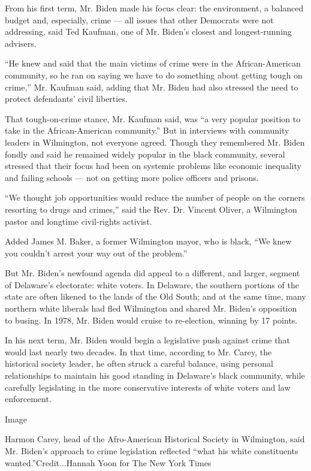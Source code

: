 From his first term, Mr. Biden made his focus clear: the environment, a
balanced budget and, especially, crime --- all issues that other
Democrats were not addressing, said Ted Kaufman, one of Mr. Biden's
closest and longest-running advisers.

``He knew and said that the main victims of crime were in the
African-American community, so he ran on saying we have to do something
about getting tough on crime,'' Mr. Kaufman said, adding that Mr. Biden
had also stressed the need to protect defendants' civil liberties.

That tough-on-crime stance, Mr. Kaufman said, was ``a very popular
position to take in the African-American community.'' But in interviews
with community leaders in Wilmington, not everyone agreed. Though they
remembered Mr. Biden fondly and said he remained widely popular in the
black community, several stressed that their focus had been on systemic
problems like economic inequality and failing schools --- not on getting
more police officers and prisons.

``We thought job opportunities would reduce the number of people on the
corners resorting to drugs and crimes,'' said the Rev. Dr. Vincent
Oliver, a Wilmington pastor and longtime civil-rights activist.

Added James M. Baker, a former Wilmington mayor, who is black, ``We knew
you couldn't arrest your way out of the problem.''

But Mr. Biden's newfound agenda did appeal to a different, and larger,
segment of Delaware's electorate: white voters. In Delaware, the
southern portions of the state are often likened to the lands of the Old
South; and at the same time, many northern white liberals had fled
Wilmington and shared Mr. Biden's opposition to busing. In 1978, Mr.
Biden would cruise to re-election, winning by 17 points.

In his next term, Mr. Biden would begin a legislative push against crime
that would last nearly two decades. In that time, according to Mr.
Carey, the historical society leader, he often struck a careful balance,
using personal relationships to maintain his good standing in Delaware's
black community, while carefully legislating in the more conservative
interests of white voters and law enforcement.

Image

Harmon Carey, head of the Afro-American Historical Society in
Wilmington, said Mr. Biden's approach to crime legislation reflected
``what his white constituents wanted.''Credit...Hannah Yoon for The New
York Times

